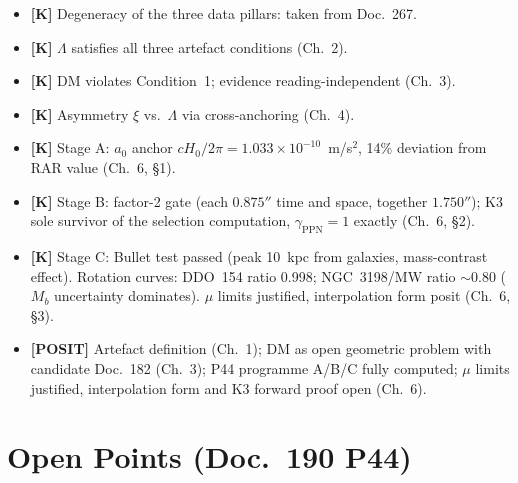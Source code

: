 \documentclass[11pt]{report}
\begin{document}
\begin{itemize}
  \item \textbf{[K]} Degeneracy of the three data pillars: taken from
        Doc.~267.
  \item \textbf{[K]} $\Lambda$ satisfies all three artefact conditions
        (Ch.~2).
  \item \textbf{[K]} DM violates Condition~1; evidence reading-independent
        (Ch.~3).
  \item \textbf{[K]} Asymmetry $\xi$ vs.\ $\Lambda$ via cross-anchoring
        (Ch.~4).
  \item \textbf{[K]} Stage A: $a_0$ anchor $cH_0/2\pi =
        1.033\times10^{-10}$~m/s$^2$, 14\% deviation from RAR value
        (Ch.~6, §1).
  \item \textbf{[K]} Stage B: factor-2 gate (each $0.875''$ time and
        space, together $1.750''$); K3 sole survivor of the selection
        computation, $\gamma_\text{PPN}=1$ exactly (Ch.~6, §2).
  \item \textbf{[K]} Stage C: Bullet test passed (peak 10~kpc from
        galaxies, mass-contrast effect). Rotation curves: DDO~154 ratio
        0.998; NGC~3198/MW ratio $\sim$0.80 ($M_b$ uncertainty dominates).
        $\mu$ limits justified, interpolation form posit (Ch.~6, §3).
  \item \textbf{[POSIT]} Artefact definition (Ch.~1); DM as open
        geometric problem with candidate Doc.~182 (Ch.~3); P44 programme
        A/B/C fully computed; $\mu$ limits justified, interpolation form
        and K3 forward proof open (Ch.~6).
\end{itemize}

\chapter{Open Points (Doc.~190 P44)}
\end{document}
